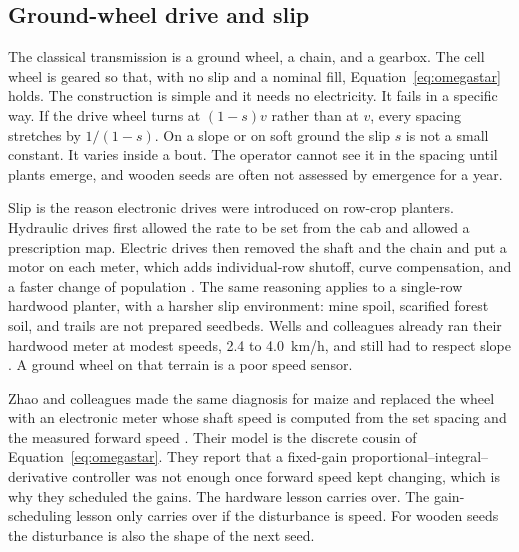 \subsection{Ground-wheel drive and slip}

The classical transmission is a ground wheel, a chain, and a gearbox. The cell wheel is geared so that, with no slip and a nominal fill, Equation~\eqref{eq:omegastar} holds. The construction is simple and it needs no electricity. It fails in a specific way. If the drive wheel turns at $(1-s)v$ rather than at $v$, every spacing stretches by $1/(1-s)$. On a slope or on soft ground the slip $s$ is not a small constant. It varies inside a bout. The operator cannot see it in the spacing until plants emerge, and wooden seeds are often not assessed by emergence for a year.

Slip is the reason electronic drives were introduced on row-crop planters. Hydraulic drives first allowed the rate to be set from the cab and allowed a prescription map. Electric drives then removed the shaft and the chain and put a motor on each meter, which adds individual-row shutoff, curve compensation, and a faster change of population \cite{aces2024}. The same reasoning applies to a single-row hardwood planter, with a harsher slip environment: mine spoil, scarified forest soil, and trails are not prepared seedbeds. Wells and colleagues already ran their hardwood meter at modest speeds, 2.4 to 4.0~km/h, and still had to respect slope \cite{wells1990}. A ground wheel on that terrain is a poor speed sensor.

Zhao and colleagues made the same diagnosis for maize and replaced the wheel with an electronic meter whose shaft speed is computed from the set spacing and the measured forward speed \cite{zhao2024}. Their model is the discrete cousin of Equation~\eqref{eq:omegastar}. They report that a fixed-gain proportional--integral--derivative controller was not enough once forward speed kept changing, which is why they scheduled the gains. The hardware lesson carries over. The gain-scheduling lesson only carries over if the disturbance is speed. For wooden seeds the disturbance is also the shape of the next seed.

